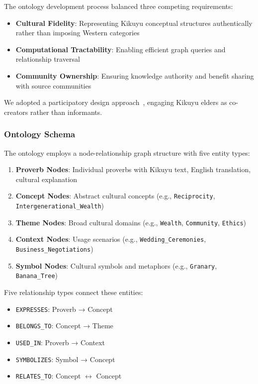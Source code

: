 The ontology development process balanced three competing requirements:
\begin{itemize}
    \item \textbf{Cultural Fidelity}: Representing Kikuyu conceptual structures authentically rather than imposing Western categories
    \item \textbf{Computational Tractability}: Enabling efficient graph queries and relationship traversal
    \item \textbf{Community Ownership}: Ensuring knowledge authority and benefit sharing with source communities
\end{itemize}

We adopted a participatory design approach~\cite{schuler1993participatory}, engaging Kikuyu elders as co-creators rather than informants.

\subsubsection{Ontology Schema}

The ontology employs a node-relationship graph structure with five entity types:

\begin{enumerate}
    \item \textbf{Proverb Nodes}: Individual proverbs with Kikuyu text, English translation, cultural explanation
    \item \textbf{Concept Nodes}: Abstract cultural concepts (e.g., \texttt{Reciprocity}, \texttt{Intergenerational\_Wealth})
    \item \textbf{Theme Nodes}: Broad cultural domains (e.g., \texttt{Wealth}, \texttt{Community}, \texttt{Ethics})
    \item \textbf{Context Nodes}: Usage scenarios (e.g., \texttt{Wedding\_Ceremonies}, \texttt{Business\_Negotiations})
    \item \textbf{Symbol Nodes}: Cultural symbols and metaphors (e.g., \texttt{Granary}, \texttt{Banana\_Tree})
\end{enumerate}

Five relationship types connect these entities:

\begin{itemize}
    \item \texttt{EXPRESSES}: Proverb → Concept
    \item \texttt{BELONGS\_TO}: Concept → Theme
    \item \texttt{USED\_IN}: Proverb → Context
    \item \texttt{SYMBOLIZES}: Symbol → Concept
    \item \texttt{RELATES\_TO}: Concept $\leftrightarrow$ Concept
\end{itemize}

